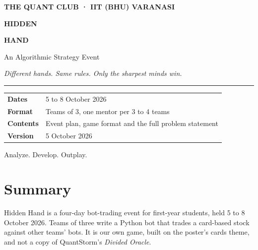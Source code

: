 \documentclass[11pt,a4paper]{article}
\begin{document}
\begin{titlepage}
\thispagestyle{empty}
\vspace*{3cm}
{\sffamily\small\color{mint}\textbf{THE QUANT CLUB · IIT (BHU) VARANASI}}\par
\vspace{1.2cm}
{\sffamily\fontsize{46}{50}\selectfont\bfseries HIDDEN\par}
{\sffamily\fontsize{46}{50}\selectfont\bfseries\color{mint} HAND\par}
\vspace{0.8cm}
{\sffamily\Large An Algorithmic Strategy Event\par}
\vspace{0.4cm}
{\large\itshape\color{quiet} Different hands. Same rules. Only the sharpest minds win.\par}
\vspace{2cm}
{\color{rule}\rule{\linewidth}{0.6pt}}\par
\vspace{0.4cm}
\begin{tabularx}{\linewidth}{@{}lL@{}}
\textbf{Dates}    & 5 to 8 October 2026 \\
\textbf{Format}   & Teams of 3, one mentor per 3 to 4 teams \\
\textbf{Contents} & Event plan, game format and the full problem statement \\
\textbf{Version}  & 5 October 2026 \\
\end{tabularx}
\vfill
{\sffamily\small\color{quiet} Analyze. Develop. Outplay.}
\end{titlepage}

\tableofcontents
\newpage

\section{Summary}

Hidden Hand is a four-day bot-trading event for first-year students, held 5 to 8 October
2026. Teams of three write a Python bot that trades a card-based stock against other teams'
bots. It is our own game, built on the poster's cards theme, and not a copy of QuantStorm's
\emph{Divided Oracle}.
\end{document}
